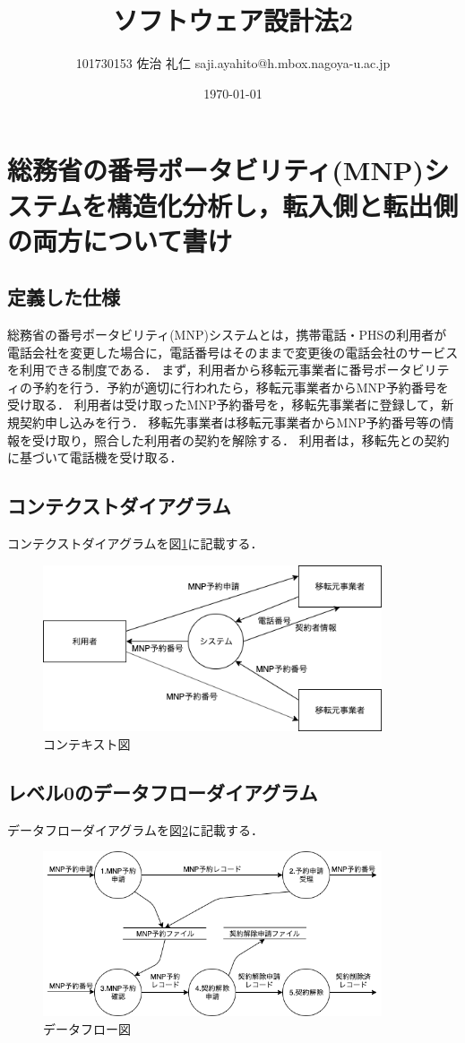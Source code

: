 \documentclass[uplatex]{jsarticle}
\title{ソフトウェア設計法2}
\author{101730153 佐治 礼仁 saji.ayahito@h.mbox.nagoya-u.ac.jp}
\date{\today}
\begin{document}
\maketitle
\section{総務省の番号ポータビリティ(MNP)システムを構造化分析し，転入側と転出側の両方について書け}
\subsection{定義した仕様}
総務省の番号ポータビリティ(MNP)システムとは，携帯電話・PHSの利用者が電話会社を変更した場合に，電話番号はそのままで変更後の電話会社のサービスを利用できる制度である．
まず，利用者から移転元事業者に番号ポータビリティの予約を行う．予約が適切に行われたら，移転元事業者からMNP予約番号を受け取る．
利用者は受け取ったMNP予約番号を，移転先事業者に登録して，新規契約申し込みを行う．
移転先事業者は移転元事業者からMNP予約番号等の情報を受け取り，照合した利用者の契約を解除する．
利用者は，移転先との契約に基づいて電話機を受け取る．
\subsection{コンテクストダイアグラム}
コンテクストダイアグラムを図\ref{fig:context-diagram}に記載する．
\begin{figure}[htbp]
  \begin{center}
    \includegraphics[clip,width=10.0cm]{figures/context-diagram.png}
    \caption{コンテキスト図}
    \label{fig:context-diagram}
  \end{center}
\end{figure}
\subsection{レベル0のデータフローダイアグラム}
データフローダイアグラムを図\ref{fig:dataflow-diagram}に記載する．
\begin{figure}[htbp]
  \begin{center}
    \includegraphics[clip,width=10.0cm]{figures/dataflow-diagram.png}
    \caption{データフロー図}
    \label{fig:dataflow-diagram}
  \end{center}
\end{figure}
\end{document}
